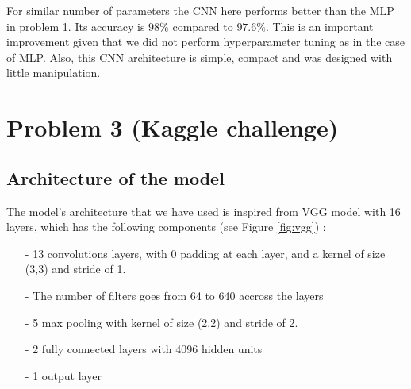 \documentclass[a4paper]{article}
\begin{document}
For similar number of parameters the CNN here performs better than the MLP in problem 1. Its accuracy is $98\%$ compared to $97.6\%$. This is an important improvement given that we did not perform hyperparameter tuning as in the case of MLP. Also, this CNN architecture is simple, compact and was designed with little manipulation.  

\newpage
\section{Problem 3 (Kaggle challenge)}
\label{sec:problem3}

\subsection{Architecture of the model}
The model's architecture that we have used is inspired from VGG model with 16 layers, which has the following components (see Figure \ref{fig:vgg}) :

\begin{itemize}
\setlength\itemsep{0em}
	\item[-] 13 convolutions layers, with 0 padding at each layer, and a kernel of size (3,3) and stride of 1.
	\item[-] The number of filters goes from 64 to 640 accross the layers
	\item[-] 5 max pooling with kernel of size (2,2) and stride of 2.
	\item[-] 2 fully connected layers with 4096 hidden units
	\item[-] 1 output layer
\end{itemize}
\end{document}
